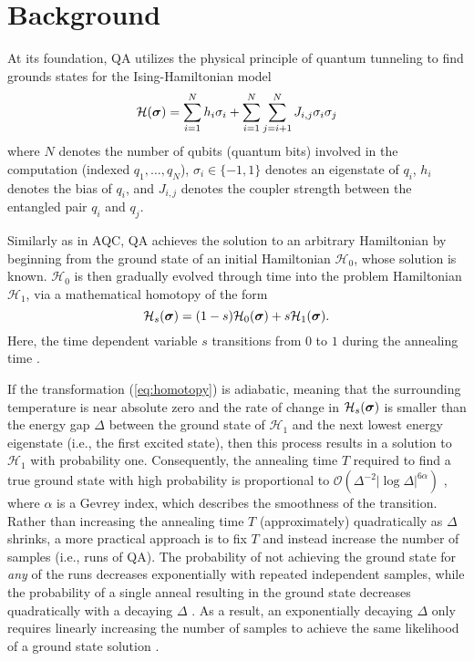 \section{Background}
\label{sec:background}

At its foundation, QA utilizes the physical principle of quantum tunneling \cite{ray1989sherrington} to find grounds states for the Ising-Hamiltonian model
\begin{equation}
\mathcal{H}(\text{\boldmath$\sigma$}) = \sum_{i=1}^N h_i\sigma_i + \sum_{i=1}^N \sum_{j=i+1}^N J_{i,j} \sigma_i \sigma_j
\label{eq:hamiltonian}
\end{equation}
where $N$ denotes the number of qubits (quantum bits) involved in the computation (indexed $q_1,\ldots, q_N$), $\sigma_i \in \{-1,1\}$ denotes an eigenstate of $q_i$, $h_i$ denotes the bias of $q_i$, and $J_{i,j}$ denotes the coupler strength between the entangled pair $q_i$ and $q_j$.

Similarly as in AQC, QA achieves the solution to an arbitrary Hamiltonian by beginning from the ground state of an initial Hamiltonian $\mathcal{H}_0$, whose solution is known.
$\mathcal{H}_0$ is then gradually evolved through time into the problem Hamiltonian $\mathcal{H}_1$, via a mathematical homotopy of the form 
\begin{equation}
\mathcal{H}_s(\text{\boldmath$\sigma$}) = (1-s)\mathcal{H}_0(\text{\boldmath$\sigma$}) + s\mathcal{H}_1(\text{\boldmath$\sigma$}).
\label{eq:homotopy}
\end{equation}
Here, the time dependent variable $s$ transitions from $0$ to $1$ during the annealing time \cite{albash2018adiabatic}.

If the transformation (\ref{eq:homotopy}) is adiabatic, meaning that the surrounding temperature is near absolute zero and the rate of change in $\mathcal{H}_s(\text{\boldmath$\sigma$})$ is smaller than the energy gap $\Delta$ between the ground state of $\mathcal{H}_1$ and the next lowest energy eigenstate (i.e., the first excited state), then this process results in a solution to $\mathcal{H}_1$ with probability one.
Consequently, the annealing time $T$ required to find a true ground state with high probability is proportional to $\mathcal{O}(\Delta^{-2}|\log \Delta|^{6\alpha})$ \cite{elgart2012note}, where $\alpha$ is a Gevrey index, which describes the smoothness of the transition.
Rather than increasing the annealing time $T$ (approximately) quadratically as $\Delta$ shrinks, a more practical approach is to fix $T$ and instead increase the number of samples (i.e., runs of QA).
The probability of not achieving the ground state for {\it any} of the runs decreases exponentially with repeated independent samples, while the probability of a single anneal resulting in the ground state decreases quadratically with a decaying $\Delta$ \cite{kadowaki1998quantum}.
As a result, an exponentially decaying $\Delta$ only requires linearly increasing the number of samples to achieve the same likelihood of a ground state solution \cite{jiang2018quantum}.

